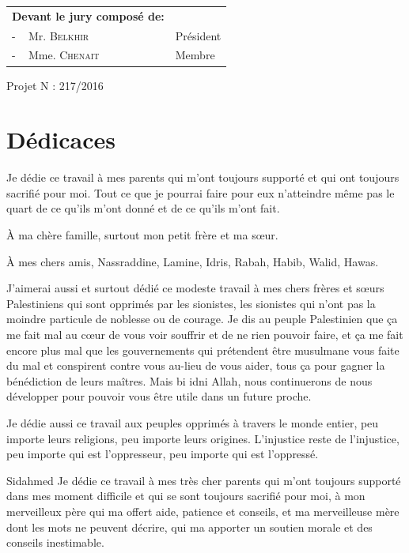\begin{table}[h]
    \begin{tabular}{p{6.5cm}p{5cm}}
    \textbf{Devant le jury composé de:}&\\
    - \,\,\, Mr. \textsc{Belkhir} & Président \\
    - \,\,\, Mme. \textsc{Chenait} & Membre \\
    \end{tabular}
\end{table}

\vspace{2cm}
\begin{center}
Projet N : 217/2016
\end{center}

\clearpage



\chapter*{Dédicaces}
Je dédie ce travail à mes parents qui m'ont toujours supporté et qui ont toujours sacrifié pour moi. Tout ce que
je pourrai faire pour eux n'atteindre même pas le quart de ce qu'ils m'ont donné et de ce qu'ils m'ont fait.

À ma chère famille, surtout mon petit frère et ma sœur.

À mes chers amis, Nassraddine, Lamine, Idris, Rabah, Habib, Walid, Hawas.

J'aimerai aussi et surtout dédié ce modeste travail à mes chers frères et sœurs Palestiniens qui sont opprimés par les
sionistes, les sionistes qui n'ont pas la moindre particule de noblesse ou de courage. Je dis au peuple Palestinien
que ça me fait mal au cœur de vous voir souffrir et de ne rien pouvoir faire, et ça me fait encore plus mal que 
les gouvernements qui prétendent être musulmane vous faite du mal et conspirent contre vous au-lieu de vous aider, tous 
ça pour gagner la bénédiction de leurs maîtres. 
Mais bi idni Allah, nous continuerons de nous développer pour pouvoir vous être utile dans un future proche.

Je dédie aussi ce travail aux peuples opprimés à travers le monde entier, peu importe leurs religions, peu importe
leurs origines. L'injustice reste de l'injustice, peu importe qui est l'oppresseur, peu importe qui est l'oppressé.

\vfill
Sidahmed
\vfill
\newpage
Je dédie ce travail à mes très cher parents qui m'ont toujours supporté dans mes moment difficile et qui se sont toujours sacrifié pour moi, à mon merveilleux père qui ma offert aide, patience et conseils, et ma merveilleuse mère dont les mots ne peuvent décrire, qui ma apporter un soutien morale et des conseils inestimable.

